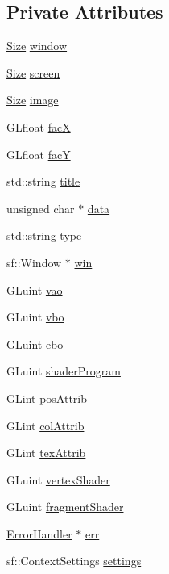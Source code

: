 \subsection*{Private Attributes}
\begin{DoxyCompactItemize}
\item 
\mbox{\hyperlink{classSize}{Size}} \mbox{\hyperlink{classOpenGLWrapper_ae43805c83ddf7c554d85ca9941d440d1}{window}}
\item 
\mbox{\hyperlink{classSize}{Size}} \mbox{\hyperlink{classOpenGLWrapper_ab9d6bc93fd838a85c8bdb98224a9a54c}{screen}}
\item 
\mbox{\hyperlink{classSize}{Size}} \mbox{\hyperlink{classOpenGLWrapper_adef2a1ed2b3a9a9602b2cf2b82acc9dd}{image}}
\item 
G\+Lfloat \mbox{\hyperlink{classOpenGLWrapper_af7c784cd0a15f2330cde7f8279569fde}{facX}}
\item 
G\+Lfloat \mbox{\hyperlink{classOpenGLWrapper_ab409f53208ee8f7e7fc6c3cddf3febe7}{facY}}
\item 
std\+::string \mbox{\hyperlink{classOpenGLWrapper_a558d0311b7f0e3ebc543a20a0c874bcc}{title}}
\item 
unsigned char $\ast$ \mbox{\hyperlink{classOpenGLWrapper_a4d2dbdf66c23f052c301b216f675f96e}{data}}
\item 
std\+::string \mbox{\hyperlink{classOpenGLWrapper_a57e78029e7ee9951ea961b414b0e64e4}{type}}
\item 
sf\+::\+Window $\ast$ \mbox{\hyperlink{classOpenGLWrapper_a021c9b98a096b8cffc78c7eac37a03c6}{win}}
\item 
G\+Luint \mbox{\hyperlink{classOpenGLWrapper_a87d3090b9ef2e52b7b7d0bbf8df184ab}{vao}}
\item 
G\+Luint \mbox{\hyperlink{classOpenGLWrapper_a3585a72247c149b07d7fb56f5a464646}{vbo}}
\item 
G\+Luint \mbox{\hyperlink{classOpenGLWrapper_a3344488b7f5b35d603563de9579673f6}{ebo}}
\item 
G\+Luint \mbox{\hyperlink{classOpenGLWrapper_a171549c356bdf33cef0e24bfdf1f2d25}{shader\+Program}}
\item 
G\+Lint \mbox{\hyperlink{classOpenGLWrapper_addd025216ff4986440d529dec28d9996}{pos\+Attrib}}
\item 
G\+Lint \mbox{\hyperlink{classOpenGLWrapper_ac280ce51d31dead83985ec09b1d40402}{col\+Attrib}}
\item 
G\+Lint \mbox{\hyperlink{classOpenGLWrapper_a4584c807d7a7fa892de4e30b7faad65a}{tex\+Attrib}}
\item 
G\+Luint \mbox{\hyperlink{classOpenGLWrapper_a1df1740f86a127eaa65fa4d2e767a86a}{vertex\+Shader}}
\item 
G\+Luint \mbox{\hyperlink{classOpenGLWrapper_a6cc429caf98d32f532ba97740fe1b3c8}{fragment\+Shader}}
\item 
\mbox{\hyperlink{classErrorHandler}{Error\+Handler}} $\ast$ \mbox{\hyperlink{classOpenGLWrapper_aecbe9ae2a0482fba4420a26c38d42e35}{err}}
\item 
sf\+::\+Context\+Settings \mbox{\hyperlink{classOpenGLWrapper_a7d4d65ea4174aad513c93a7e287c46d5}{settings}}
\end{DoxyCompactItemize}


